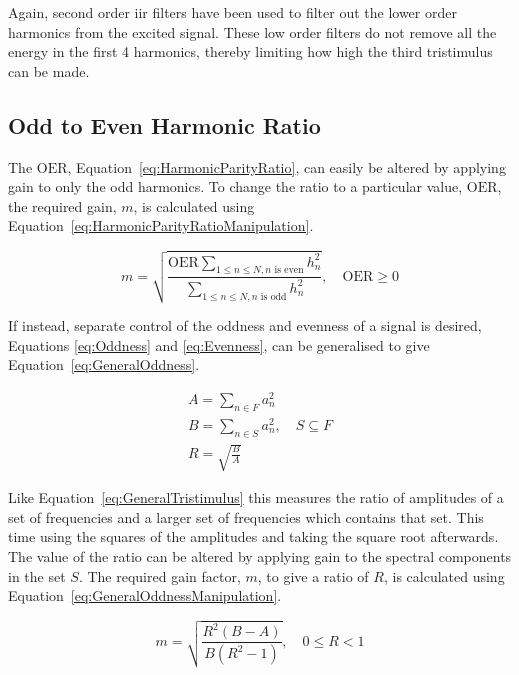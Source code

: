 		Again, second order \acrshort{iir} filters have been used to filter out the lower order harmonics from the
		excited signal.	These low order filters do not remove all the energy in the first 4 harmonics, thereby
		limiting how high the third tristimulus can be made.

	\subsection{Odd to Even Harmonic Ratio}
	\label{sec:FeatureControl-Parameterisation-HarmonicParityRatio}
		The $\mathrm{OER}$, Equation~\ref{eq:HarmonicParityRatio}, can easily be altered by applying gain to only
		the odd harmonics. To change the ratio to a particular value, $\mathrm{OER}$, the required gain, $m$, is
		calculated using Equation~\ref{eq:HarmonicParityRatioManipulation}.

		\begin{equation}
			m = \sqrt{\frac{\mathrm{OER}\sum_{1 \leq n \leq N, n \text{ is even}} h_{n}^{2}}
				       {\sum_{1 \leq n \leq N, n \text{ is odd}} h_{n}^{2}}},
				       \quad \mathrm{OER} \geq 0
		       \label{eq:HarmonicParityRatioManipulation}
		\end{equation}

		If instead, separate control of the oddness and evenness of a signal is desired, Equations \ref{eq:Oddness}
		and \ref{eq:Evenness}, can be generalised to give Equation~\ref{eq:GeneralOddness}.

		\begin{gather}
			A = \sum_{n \in F} a_{n}^{2} \nonumber \\
			B = \sum_{n \in S} a_{n}^{2}, \quad S \subseteq F \nonumber \\
			R = \sqrt{\frac{B}{A}}
			\label{eq:GeneralOddness}
		\end{gather}

		Like Equation~\ref{eq:GeneralTristimulus} this measures the ratio of amplitudes of a set of frequencies and
		a larger set of frequencies which contains that set. This time using the squares of the amplitudes and
		taking the square root afterwards. The value of the ratio can be altered by applying gain to the spectral
		components in the set $S$. The required gain factor, $m$, to give a ratio of $R$, is calculated using
		Equation~\ref{eq:GeneralOddnessManipulation}.

		\begin{equation}
			m = \sqrt{\frac{R^{2}(B - A)}{B(R^{2} - 1)}}, \quad 0 \leq R < 1
			\label{eq:GeneralOddnessManipulation}
		\end{equation}

